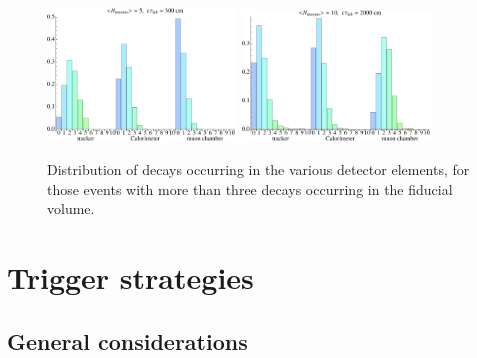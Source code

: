 \begin{figure}
\includegraphics[width=0.45\textwidth]{figures/emerging_histograms_5.pdf}\hfill
\includegraphics[width=0.45\textwidth]{figures/emerging_histograms_10.pdf}
\caption{Distribution of decays occurring in the various detector elements, for those events with more than three decays occurring in the fiducial volume.\label{fig:detectorelements}}
\end{figure}

\section{Trigger strategies}
\label{sec:darkshowertrig}

\subsection{General considerations}

